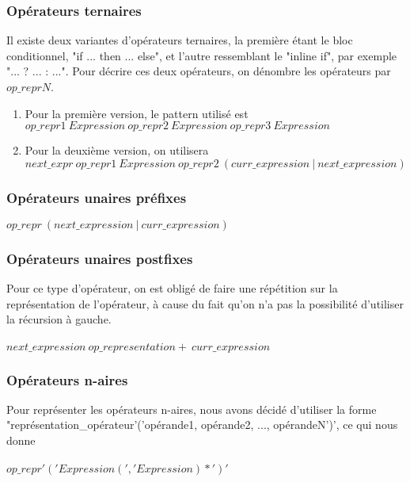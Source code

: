 \documentclass{article}
\begin{document}
\subsubsection{Opérateurs ternaires}
Il existe deux variantes d'opérateurs ternaires, la première étant le bloc conditionnel, "if ... then ... else", et l'autre ressemblant le "inline if", par exemple "... ? ... : ...". Pour décrire ces deux opérateurs, on dénombre les opérateurs par $op\_reprN$.
\begin{enumerate}
	\item Pour la première version, le pattern utilisé est \newline $op\_repr1 \ Expression \ op\_repr2 \ Expression \ op\_repr3 \ Expression$
	\item Pour la deuxième version, on utilisera \newline
	$next\_expr \ op\_repr1 \ Expression \ op\_repr2 \ (curr\_expression \ | \ next\_expression)$
\end{enumerate}
\subsubsection{Opérateurs unaires préfixes}
$op\_repr \ (next\_expression \ | \ curr\_expression)$
\subsubsection{Opérateurs unaires postfixes}
Pour ce type d'opérateur, on est obligé de faire une répétition sur la représentation de l'opérateur, à cause du fait qu'on n'a pas la possibilité d'utiliser la récursion à gauche. \\ \\
$next\_expression \ op\_representation+ \ curr\_expression$
\subsubsection{Opérateurs n-aires}
Pour représenter les opérateurs n-aires, nous avons décidé d'utiliser la forme "représentation\_opérateur'('opérande1, opérande2, ..., opérandeN')', ce qui nous donne \\ \\
$op\_repr'('Expression(','Expression)*')'$
\end{document}
